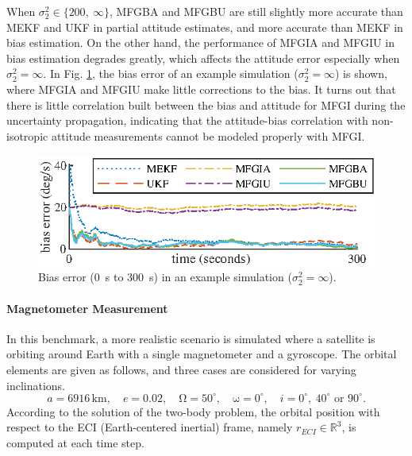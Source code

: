 When $\sigma_2^2 \in \{200,\ \infty\}$, MFGBA and MFGBU are still slightly more accurate than MEKF and UKF in partial attitude estimates, and more accurate than MEKF in bias estimation.
On the other hand, the performance of MFGIA and MFGIU in bias estimation degrades greatly, which affects the attitude error especially when $\sigma_2^2 = \infty$.
In Fig. \ref{fig:attEst-sim2-trajectory-bias}, the bias error of an example simulation ($\sigma_2^2=\infty$) is shown, where MFGIA and MFGIU make little corrections to the bias.
It turns out that there is little correlation built between the bias and attitude for MFGI during the uncertainty propagation, indicating that the attitude-bias correlation with non-isotropic attitude measurements cannot be modeled properly with MFGI.

\begin{figure}
	\centering
	\includegraphics[scale=1.4]{figures/attEst-sim2-trajectory-bias}
	\caption{Bias error (\SI{0}{\second} to \SI{300}{\second}) in an example simulation ($\sigma_2^2=\infty$). \label{fig:attEst-sim2-trajectory-bias}}
\end{figure}

\paragraph{Magnetometer Measurement}

In this benchmark, a more realistic scenario is simulated where a satellite is orbiting around Earth with a single magnetometer and a gyroscope.
The orbital elements are given as follows, and three cases are considered for varying inclinations. 
\begin{equation*}
	a=6916\,\mathrm{km},\quad
	e=0.02,\quad
	\mathrm{\Omega} = 50^\circ,\quad
	\mathrm{\omega} = 0^\circ,\quad
	i = 0^\circ,\ 40^\circ \text{ or } 90^\circ.
\end{equation*}
According to the solution of the two-body problem, the orbital position with respect to the ECI (Earth-centered inertial) frame, namely $r_{ECI}\in\mathbb{R}^3$, is computed at each time step.

